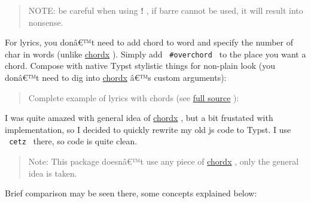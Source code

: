 
\begin{quote}
NOTE: be careful when using \textbf{!} , if barre cannot be used, it
will result into nonsense.
\end{quote}

For lyrics, you donâ€™t need to add chord to word and specify the number
of char in words (unlike
\href{https://github.com/ljgago/typst-chords}{chordx} ). Simply add
\texttt{\ \#overchord\ } to the place you want a chord. Compose with
native Typst stylistic things for non-plain look (you donâ€™t need to
dig into \href{https://github.com/ljgago/typst-chords}{chordx} â€™s
custom arguments):

\begin{Shaded}
\begin{Highlighting}[]



\end{Highlighting}
\end{Shaded}

\begin{quote}
Complete example of lyrics with chords (see
\href{https://github.com/typst/packages/raw/main/packages/preview/conchord/0.2.0/examples/zombie.typ}{full
source} ):
\end{quote}


I was quite amazed with general idea of
\href{https://github.com/ljgago/typst-chords}{chordx} , but a bit
frustated with implementation, so I decided to quickly rewrite my old js
code to Typst. I use \texttt{\ cetz\ } there, so code is quite clean.

\begin{quote}
Note: This package doesnâ€™t use any piece of
\href{https://github.com/ljgago/typst-chords}{chordx} , only the general
idea is taken.
\end{quote}

Brief comparison may be seen there, some concepts explained below:

